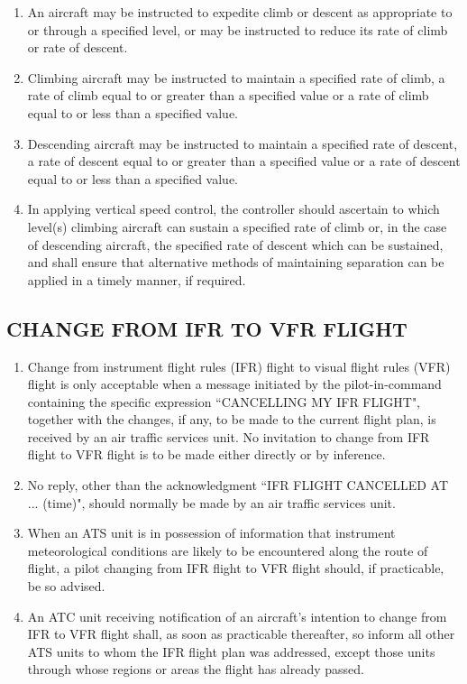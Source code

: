 \begin{enumerate}
    \item An aircraft may be instructed to expedite climb or descent as appropriate to or through a specified level, or may be instructed to reduce its rate of climb or rate of descent.
    \item Climbing aircraft may be instructed to maintain a specified rate of climb, a rate of climb equal to or greater than a specified value or a rate of climb equal to or less than a specified value.
    \item Descending aircraft may be instructed to maintain a specified rate of descent, a rate of descent equal to or greater than a specified value or a rate of descent equal to or less than a specified value.
    \item In applying vertical speed control, the controller should ascertain to which level(s) climbing aircraft can sustain a specified rate of climb or, in the case of descending aircraft, the specified rate of descent which can be sustained, and shall ensure that alternative methods of maintaining separation can be applied in a timely manner, if required.
\end{enumerate}

\subsection[Change from IFR to VFR flight]{CHANGE FROM IFR TO VFR FLIGHT}

\begin{enumerate}[label=\arabic{section}.\arabic{subsection}.\arabic*]
    \item Change from instrument flight rules (IFR) flight to visual flight rules (VFR) flight is only acceptable when a message initiated by the pilot-in-command containing the specific expression ``CANCELLING MY IFR FLIGHT", together with the changes, if any, to be made to the current flight plan, is received by an air traffic services unit. No invitation to change from IFR flight to VFR flight is to be made either directly or by inference.
    \item No reply, other than the acknowledgment ``IFR FLIGHT CANCELLED AT ... (time)", should normally be made by an air traffic services unit.
    \item When an ATS unit is in possession of information that instrument meteorological conditions are likely to be encountered along the route of flight, a pilot changing from IFR flight to VFR flight should, if practicable, be so advised.
    \item An ATC unit receiving notification of an aircraft's intention to change from IFR to VFR flight shall, as soon as practicable thereafter, so inform all other ATS units to whom the IFR flight plan was addressed, except those units through whose regions or areas the flight has already passed.
\end{enumerate}

